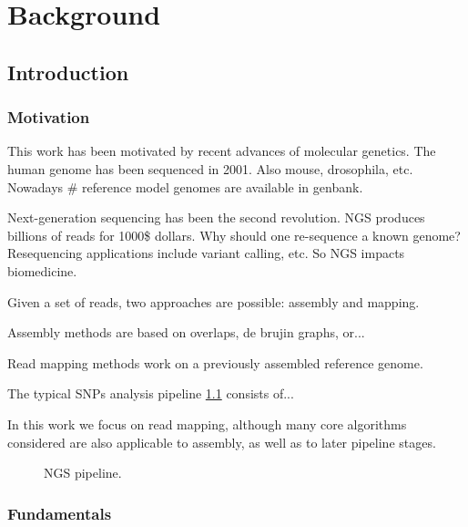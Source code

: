 \chapter{Background}


\section{Introduction}


\subsection{Motivation}

This work has been motivated by recent advances of molecular genetics.
The human genome has been sequenced in 2001. Also mouse, drosophila, etc.
Nowadays \# reference model genomes are available in genbank.

Next-generation sequencing has been the second revolution.
NGS produces billions of reads for 1000\$ dollars.
Why should one re-sequence a known genome?
Resequencing applications include variant calling, etc.
So NGS impacts biomedicine.

Given a set of reads, two approaches are possible: assembly and mapping.

Assembly methods are based on overlaps, de brujin graphs, or...

Read mapping methods work on a previously assembled reference genome.

The typical SNPs analysis pipeline \ref{fig:ngs-pipeline} consists of...

In this work we focus on read mapping, although many core algorithms considered are also applicable to assembly, as well as to later pipeline stages.

\begin{figure}[h]
\caption{NGS pipeline.}
\label{fig:ngs-pipeline}
\end{figure}


\subsection{Fundamentals}

